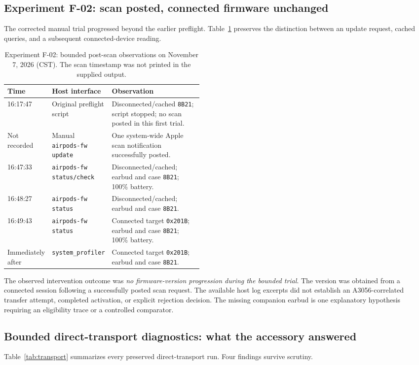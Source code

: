 \documentclass[11pt,letterpaper]{article}
\begin{document}
\subsection{Experiment F-02: scan posted, connected firmware unchanged}
The corrected manual trial progressed beyond the earlier preflight. Table~\ref{tab:f02} preserves the distinction between an update request, cached queries, and a subsequent connected-device reading.
\begin{table}[htbp]\centering\small
\caption{Experiment F-02: bounded post-scan observations on November 7, 2026 (CST). The scan timestamp was not printed in the supplied output.}\label{tab:f02}
\begin{tabularx}{\linewidth}{@{}p{0.19\linewidth}p{0.27\linewidth}X@{}}\toprule
Time & Host interface & Observation \\ \midrule
16:17:47 & Original preflight script & Disconnected/cached \texttt{8B21}; script stopped; no scan posted in this first trial. \\
Not recorded & Manual \texttt{airpods-fw update} & One system-wide Apple scan notification successfully posted. \\
16:47:33 & \texttt{airpods-fw status/check} & Disconnected/cached; earbud and case \texttt{8B21}; 100\% battery. \\
16:48:27 & \texttt{airpods-fw status} & Disconnected/cached; earbud and case \texttt{8B21}. \\
16:49:43 & \texttt{airpods-fw status} & Connected target \texttt{0x201B}; earbud and case \texttt{8B21}; 100\% battery. \\
Immediately after & \texttt{system\_profiler} & Connected target \texttt{0x201B}; earbud and case \texttt{8B21}. \\
\bottomrule\end{tabularx}
\end{table}

The observed intervention outcome was \emph{no firmware-version progression during the bounded trial}. The version was obtained from a connected session following a successfully posted scan request. The available host log excerpts did not establish an A3056-correlated transfer attempt, completed activation, or explicit rejection decision. The missing companion earbud is one explanatory hypothesis requiring an eligibility trace or a controlled comparator.

\subsection{Bounded direct-transport diagnostics: what the accessory answered}\label{sec:transport}
Table~\ref{tab:transport} summarizes every preserved direct-transport run. Four findings survive scrutiny.
\end{document}
